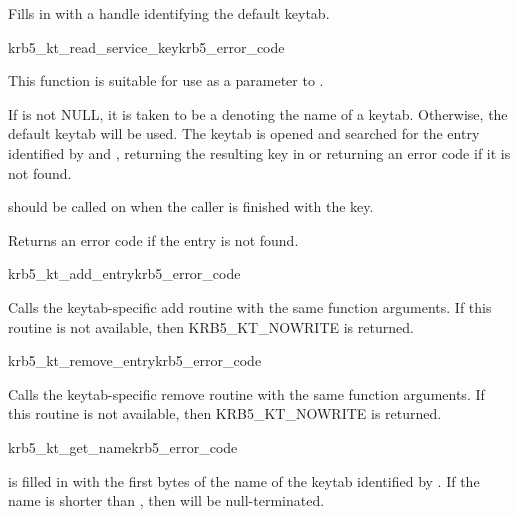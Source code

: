 Fills in  with  a handle identifying the default keytab.

\begin{funcdecl}{krb5_kt_read_service_key}{krb5_error_code}{\funcin}
\funcout
{}
\end{funcdecl}

This function is suitable for use as a parameter to
.

If  is not NULL, it is taken to be a
 denoting the name of a keytab.  Otherwise, the default
keytab will be used.
The keytab is opened and searched for the entry identified by
 and , returning the resulting key
in  or returning an error code if it is not found. 

 should be called on  when
the caller is finished with the key.

Returns an error code if the entry is not found.

\begin{funcdecl}{krb5_kt_add_entry}{krb5_error_code}{\funcin}
\end{funcdecl}

Calls the keytab-specific add routine 
with the same function arguments.  If this routine is not available,
then KRB5_KT_NOWRITE is returned.

\begin{funcdecl}{krb5_kt_remove_entry}{krb5_error_code}{\funcin}
\end{funcdecl}

Calls the keytab-specific remove routine
 with the same function arguments.
If this routine is not available, then KRB5_KT_NOWRITE is returned.

\begin{funcdecl}{krb5_kt_get_name}{krb5_error_code}{\funcin}
\funcout
{}
\funcin
{}
\end{funcdecl}

 is filled in with the first  bytes of
the name of the keytab identified by .
If the name is shorter than , then 
will be null-terminated.

